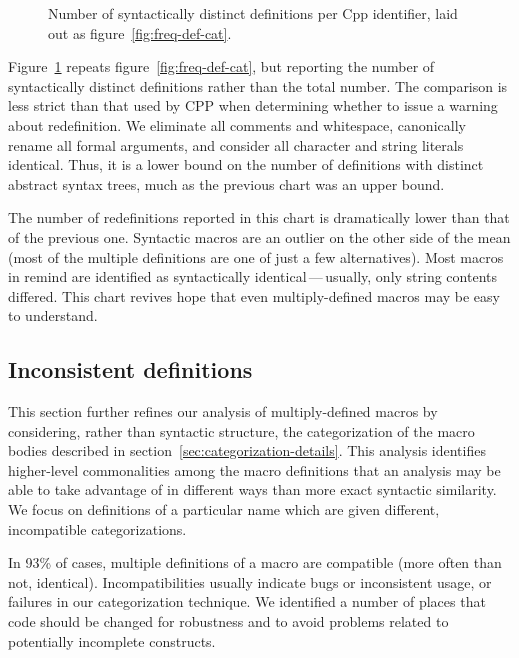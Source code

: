 \documentclass[10pt]{article}
\newcommand{\pkg}[1]{\textsf{#1}}
\begin{document}
\begin{figure}
  \centerline{}
  \caption{Number of syntactically distinct definitions per Cpp identifier,
    laid out as figure~\ref{fig:freq-def-cat}.}
  \label{fig:freq-ddf-cat}
\end{figure}
        
Figure~\ref{fig:freq-ddf-cat} repeats figure~\ref{fig:freq-def-cat}, but
reporting the number of syntactically distinct definitions rather than the
total number.  The comparison is less strict than that used by CPP when
determining whether to issue a warning about redefinition.  We eliminate
all comments and whitespace, canonically rename all formal arguments, and
consider all character and string literals identical.  Thus, it is a lower
bound on the number of definitions with distinct abstract syntax trees,
much as the previous chart was an upper bound.

The number of redefinitions reported in this chart is dramatically lower
than that of the previous one.  Syntactic macros are an outlier on the
other side of the mean (most of the multiple definitions are one of just a
few alternatives).  Most macros in \pkg{remind} are identified as
syntactically identical\,---\,usually, only string contents differed.  This
chart revives hope that even multiply-defined macros may be easy to
understand.


\subsection{Inconsistent definitions}
\label{sec:inconsistent}

This section further refines our analysis of multiply-defined macros by
considering, rather than syntactic structure, the categorization of the
macro bodies described in section~\ref{sec:categorization-details}.  This
analysis identifies higher-level commonalities among the macro definitions
that an analysis may be able to take advantage of in different ways than
more exact syntactic similarity.  We focus on definitions of a particular
name which are given different, incompatible categorizations.

In 93\% of cases, multiple definitions of a macro are compatible (more
often than not, identical).  Incompatibilities usually indicate bugs or
inconsistent usage, or failures in our categorization technique.  We
identified a number of places that code should be changed for robustness
and to avoid problems related to potentially incomplete constructs.
\end{document}
